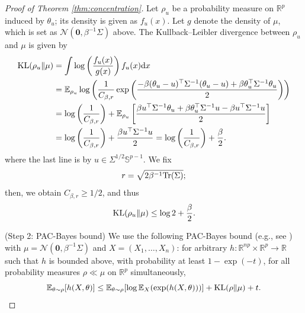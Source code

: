 \documentclass[11pt,a4paper]{article}
\theoremstyle{remark}
\theoremstyle{definition}
\newcommand{\bX}{X}
\newcommand{\bu}{u}
\newcommand{\bx}{x}
\newcommand{\btheta}{\theta}
\newcommand{\bSigma}{\Sigma}
\newcommand{\bbS}{\mathbb{S}}
\newcommand{\R}{\mathbb{R}}
\newcommand{\E}{\mathbb{E}}
\newcommand{\Gauss}{\mathcal{N}}
\newcommand{\tr}{\textnormal{Tr}}
\newcommand{\diff}{\textnormal{d}}
\newcommand{\zero}{\mathbf{0}}
\theoremstyle{definition}
\begin{document}
\begin{bibunit}[apalike]
\begin{proof}[Proof of Theorem \ref{thm:concentration}]
    Let $\rho_{\bu}$ be a probability measure on $\R^{p}$ induced by $\btheta_{\bu}$; its density is given as $f_{\bu}(\bx)$.
    Let $g$ denote the density of $\mu$, which is set as $\Gauss(\zero,\beta^{-1}\bSigma)$ above.
    The Kullback--Leibler divergence between $\rho_{\bu}$ and $\mu$ is given by
    \begin{align*}
        \textnormal{KL}(\rho_{\bu}\|\mu)&=\int \log\left(\frac{f_{\bu}(\bx)}{g(\bx)}\right)f_{\bu}(\bx)\diff \bx\\
        &=\E_{\rho_{\bu}}\log\left(\frac{1}{C_{\beta,r}}\exp\left(\frac{-\beta(\btheta_{\bu}-\bu)^{\top}\bSigma^{-1}(\btheta_{\bu}-\bu)+\beta\btheta_{\bu}^{\top}\bSigma^{-1}\btheta_{\bu}}{2}\right)\right)\\
        &=\log\left(\frac{1}{C_{\beta,r}}\right)+\E_{\rho_{\bu}}\left[\frac{\beta \bu^{\top}\bSigma^{-1}\btheta_{\bu}+\beta \btheta_{\bu}^{\top}\bSigma^{-1}\bu-\beta\bu^{\top}\bSigma^{-1}\bu}{2}\right]\\
        &=\log\left(\frac{1}{C_{\beta,r}}\right)+\frac{\beta\bu^{\top}\bSigma^{-1}\bu}{2}=\log\left(\frac{1}{C_{\beta,r}}\right)+\frac{\beta}{2}.
    \end{align*}
    where the last line is by $\bu\in\bSigma^{1/2}\bbS^{p-1}$.
    We fix
    \begin{equation*}
        r=\sqrt{2\beta^{-1}\tr(\bSigma)};
    \end{equation*}
    then, we obtain $C_{\beta,r}\ge 1/2$, and thus
    \begin{equation}
        \textnormal{KL}(\rho_{\bu}\|\mu)\le \log2+\frac{\beta}{2}.\label{eq:KL}
    \end{equation}

    (Step 2: PAC-Bayes bound)
    We use the following PAC-Bayes bound (e.g., see \citealp{catoni2004statistical,catoni2017dimension}) with $\mu=\Gauss(\zero,\beta^{-1}\bSigma)$ and $\bX=(\bX_{1},\ldots,\bX_{n})$: for arbitrary $h:\R^{np}\times\R^{p}\to\R$ such that $h$ is bounded above, with probability at least $1-\exp(-t)$, for all probability measures $\rho\ll\mu$ on $\R^{p}$ simultaneously,
    \begin{equation}\label{eq:pacbayes}
        \E_{\btheta\sim \rho}[h(\bX,\btheta)]\le \E_{\btheta\sim \rho}[\log\E_{\bX}(\exp(h(\bX,\btheta)))]+\textnormal{KL}(\rho\|\mu)+t.
    \end{equation}
    

\end{proof}
\end{bibunit}
\end{document}
